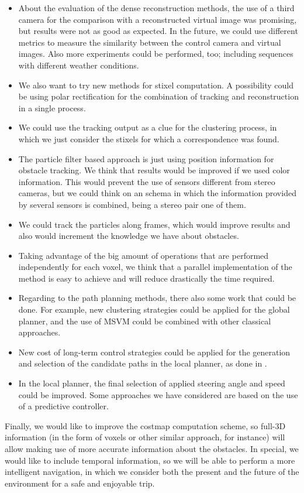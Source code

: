 \begin{itemize}
 \item About the evaluation of the dense reconstruction methods, the use of a third camera for the comparison with a reconstructed virtual image was promising, but results were not as good as expected. In the future, we could use different metrics to measure the similarity between the control camera and virtual images. Also more experiments could be performed, too; including sequences with different weather conditions.
 \item We also want to try new methods for stixel computation. A possibility could be using polar rectification for the combination of tracking and reconstruction in a single process. 
 \item We could use the tracking output as a clue for the clustering process, in which we just consider the stixels for which a correspondence was found.
 \item The particle filter based approach is just using position information for obstacle tracking. We think that results would be improved if we used color information. This would prevent the use of sensors different from stereo cameras, but we could think on an schema in which the information provided by several sensors is combined, being a stereo pair one of them.
 \item We could track the particles along frames, which would improve results and also would increment the knowledge we have about obstacles.
 \item Taking advantage of the big amount of operations that are performed independently for each voxel, we think that a parallel implementation of the method is easy to achieve and will reduce drastically the time required.
 \item Regarding to the path planning methods, there also some work that could be done. For example, new clustering strategies could be applied for the global planner, and the use of \ac{MSVM} could be combined with other classical approaches.
 \item New cost of long-term control strategies could be applied for the generation and selection of the candidate paths in the local planner, as done in \cite{werling2010optimal}.
 \item In the local planner, the final selection of applied steering angle and speed could be improved. Some approaches we have considered are based on the use of a predictive controller.
\end{itemize}

Finally, we would like to improve the costmap computation scheme, so full-3D information (in the form of voxels or other similar approach, for instance) will allow making use of more accurate information about the obstacles. In special, we would like to include temporal information, so we will be able to perform a more intelligent navigation, in which we consider both the present and the future of the environment for a safe and enjoyable trip.